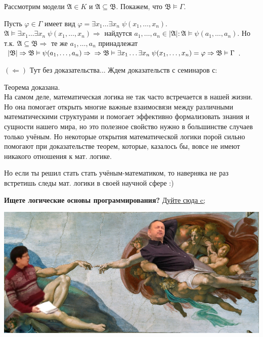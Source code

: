 \documentclass[18pt, a4paper]{extarticle}
\newcommand{\Gm}{\Gamma}
\newcommand{\vp}{\varphi}
\newcommand{\vD}{\vDash}
\newcommand{\leftdok}{\boxed{(\Leftarrow)}}
\newcommand{\mA}{\mathfrak{A}}
\newcommand{\mB}{\mathfrak{B}}
\begin{document}
Рассмотрим модели $\mA\in K$ и $\mA\subseteq\mB$. Покажем, что $\mB\vD\Gm$.

Пусть $\vp\in\Gm$ имеет вид $\vp=\exists x_1\dots\exists x_n\;\psi(x_1,\dots,x_n)$. 
\newline$\mA\vD\exists x_1\dots\exists x_n\;\psi(x_1,\dots,x_n)\Rightarrow$ найдутся $a_1,\dots,a_n\in|\mA|\!:\mA\vD\psi(a_1,\dots,a_n)$. Но т.к. $\mA\subseteq\mB\Rightarrow$ те же $a_1,\dots,a_n$ принадлежат $|\mB|\Rightarrow\mB\vD\psi(a_1,\dots,a_n)\Rightarrow\newline\Rightarrow\mB\vD\exists x_1\dots\exists x_n\;\psi(x_1,\dots,x_n)=\vp\Rightarrow\mB\vD\Gm$.

$\leftdok$ Тут без доказательства... Ждем доказательств с семинаров с:

Теорема доказана.\\

На самом деле, математическая логика не так часто встречается в нашей жизни. Но она помогает открыть многие важные взаимосвязи между различными математическими структурами и помогает эффективно формализовать знания и сущности нашего мира, но это полезное свойство нужно в большинстве случаев только учёным. Но некоторые открытия математической логики порой сильно помогают при доказательстве теорем, которые, казалось бы, вовсе не имеют никакого отношения к мат. логике. 

Но если ты решил стать стать учёным-математиком, то наверняка не раз встретишь следы мат. логики в своей научной сфере :)

\begin{center}
    \textbf{Ищете логические основы программирования?} \href{https://drive.google.com/file/d/195indPwXqkkTRBh1tfSaaBuUC6zB22E6/view}{\underline{Дуйте сюда c;}}
\end{center} 

\begin{center}
    \includegraphics[scale=0.35]{images/palch.jpg}
\end{center}
\end{document}
